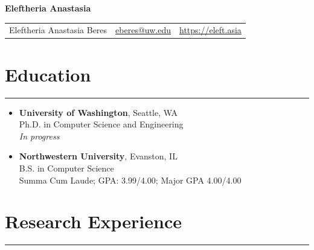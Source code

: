 \documentclass{article}
\begin{document}

\begin{center}
    \textbf{\huge{Eleftheria Anastasia}}

    \vspace{10pt}

    \begin{tabular}{c c c}
        Eleftheria Anastasia Beres & \href{mailto:eberes+cv@uw.edu}{eberes@uw.edu} &  \href{https://eleft.asia}{https://eleft.asia}
    \end{tabular}
    
\end{center}

\section*{Education}
\hrule
\vspace{10pt}

\begin{itemize}[leftmargin=1.5in]
    \item[2024–Present] \textbf{University of Washington}, Seattle, WA\\
    Ph.D. in Computer Science and Engineering\\
    \textit{In progress}
    \item[2021–2024] \textbf{Northwestern University}, Evanston, IL\\
    B.S. in Computer Science\\
    Summa Cum Laude; GPA: 3.99/4.00; Major GPA 4.00/4.00
\end{itemize}



\section*{Research Experience}
\hrule
\vspace{10pt}
\end{document}
